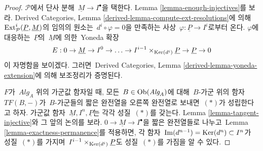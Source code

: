 \begin{proof}
$\mathcal{P}$에서 단사 분해\  $\underline{M} \to I^\bullet$을 택한다.
Lemma \ref{lemma-enough-injectives}를 보라. Derived Categories, Lemma
\ref{derived-lemma-compute-ext-resolutions}에 의해\ 
$\mathop{\mathrm{Ext}}\nolimits^i_\mathcal{P}(\underline{P}, \underline{M})$의 임의의 원소는\ 
$d^i \circ \varphi = 0$을 만족하는 사상\ 
$\varphi : \underline{P} \to I^i$로부터 온다. $\varphi$에 대응하는\ 
$\underline{P}$의\  $\underline{M}$에 의한\  Yoneda 확장
$$
E : 0 \to \underline{M} \to I^0 \to \ldots \to
I^{i - 1} \times_{\mathop{\mathrm{Ker}}(d^i)} \underline{P} \to \underline{P} \to 0
$$
이 자명함을 보이겠다. 그러면\  Derived Categories, Lemma
\ref{derived-lemma-yoneda-extension}에 의해 보조정리가 증명된다.

\medskip\noindent
$F$가\  $\textit{Alg}_A$ 위의 가군값 함자일 때, 모든\ 
$B \in \mathop{\mathrm{Ob}}\nolimits(\textit{Alg}_A)$에 대해\  $B$-가군 위의 함자\ 
$TF(B, -)$가\  $B$-가군들의 짧은 완전열을 오른쪽 완전열로 보내면\ 
$(*)$가 성립한다고 하자. 가군값 함자\ 
$\underline{M}, I^n, \underline{P}$는 각각 성질\  $(*)$를 갖는다.
Lemma \ref{lemma-tangent-injective}와 그 앞의 논의를 보라.
$0 \to \underline{M} \to I^\bullet$을 짧은 완전열들로 나누고\ 
Lemma \ref{lemma-exactness-permanence}를 적용하면, 각 함자\ 
$\mathop{\mathrm{Im}}(d^{n - 1}) = \mathop{\mathrm{Ker}}(d^n) \subset I^n$가 성질\  $(*)$를 가지며\ 
$I^{i - 1} \times_{\mathop{\mathrm{Ker}}(d^i)} \underline{P}$도 성질\  $(*)$를 가짐을
알 수 있다.


\end{proof}
